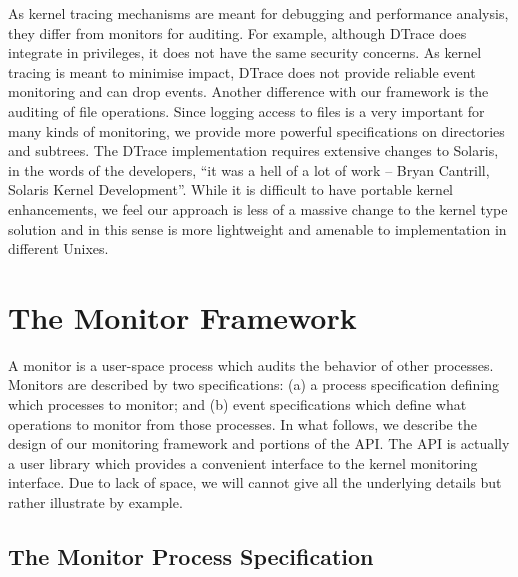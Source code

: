 As kernel tracing mechanisms are meant for debugging and performance analysis,
they differ from monitors for auditing.
For example, although DTrace does integrate in privileges,
it does not have the same security concerns.
As kernel tracing is meant to minimise impact, DTrace does not provide
reliable event monitoring and can drop events.
Another difference with our framework is the auditing of file operations.
Since logging access to files is a very important for many kinds of monitoring,
we provide more powerful specifications on directories and subtrees.
The DTrace implementation requires extensive changes to Solaris, 
in the words of the developers, 
``it was a hell of a lot of work -- Bryan Cantrill, Solaris
Kernel Development''.
While it is difficult to have portable kernel enhancements, we feel our
approach is less of a massive change to the kernel type solution and in
this sense is more lightweight and amenable to implementation 
in different Unixes.



\section{The Monitor Framework}
\label{sec:framework}

A monitor is a user-space process which audits the behavior of other processes.
Monitors are described by two specifications:
(a) a process specification defining which processes to monitor; and
(b) event specifications which define what operations to monitor from
those processes.
In what follows, we describe the design of our monitoring framework and
portions of the API. The API is actually a user library which provides
a convenient interface to the kernel monitoring interface.
Due to lack of space, we will cannot give all the underlying
details but rather illustrate by example.

\subsection{The Monitor Process Specification}


